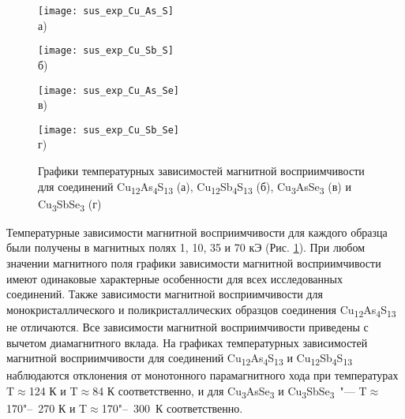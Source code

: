 \begin{figure}[b!]
  \begin{minipage}[ht]{0.5\linewidth}\centering
    \texttt{[image: sus\_exp\_Cu\_As\_S]} \\ а)
  \end{minipage}
  \hfill
  \begin{minipage}[ht]{0.5\linewidth}\centering
    \texttt{[image: sus\_exp\_Cu\_Sb\_S]} \\ б)
  \end{minipage}
\vfill
  \begin{minipage}[ht]{0.5\linewidth}\centering
    \texttt{[image: sus\_exp\_Cu\_As\_Se]} \\ в)
  \end{minipage}
  \hfill
  \begin{minipage}[ht]{0.5\linewidth}\centering
    \texttt{[image: sus\_exp\_Cu\_Sb\_Se]} \\ г)
  \end{minipage}

      \caption[Графики температурных зависимостей магнитной восприимчивости для соединений Cu\textsubscript{12}As\textsubscript{4}S\textsubscript{13} (а), Cu\textsubscript{12}Sb\textsubscript{4}S\textsubscript{13} (б), Cu\textsubscript{3}AsSe\textsubscript{3} (в) и Cu\textsubscript{3}SbSe\textsubscript{3} (г)]{Графики температурных зависимостей магнитной восприимчивости для соединений Cu\textsubscript{12}As\textsubscript{4}S\textsubscript{13} (а), Cu\textsubscript{12}Sb\textsubscript{4}S\textsubscript{13} (б), Cu\textsubscript{3}AsSe\textsubscript{3} (в) и Cu\textsubscript{3}SbSe\textsubscript{3} (г)}
    \label{img:figure3}
\end{figure}

Температурные зависимости магнитной восприимчивости для каждого
 образца были получены в магнитных полях 1, 10, 35 и 70 кЭ (Рис. \ref{img:figure3}).
При любом значении магнитного поля графики зависимости магнитной восприимчивости
 имеют одинаковые характерные особенности для всех исследованных соединений.
 Также зависимости магнитной восприимчивости для монокристаллического и
 поликристаллических образцов соединения Cu\textsubscript{12}As\textsubscript{4}S\textsubscript{13} не отличаются.
Все зависимости магнитной восприимчивости приведены с вычетом диамагнитного вклада.
На графиках температурных зависимостей магнитной восприимчивости для соединений Cu\textsubscript{12}As\textsubscript{4}S\textsubscript{13} и Cu\textsubscript{12}Sb\textsubscript{4}S\textsubscript{13}  наблюдаются отклонения от монотонного парамагнитного хода при температурах T$\approx$124 К и T$\approx$84 К соответственно, и для Cu\textsubscript{3}AsSe\textsubscript{3} и Cu\textsubscript{3}SbSe\textsubscript{3}~"---  T$\approx$170"--~270 К и T$\approx$170"--~300~К соответственно.






